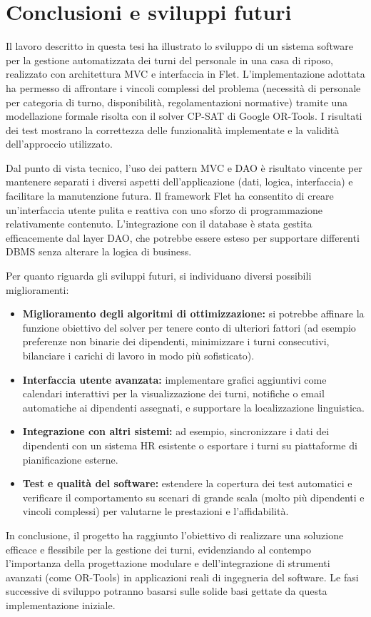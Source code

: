 \documentclass[a4paper,12pt]{report}
\begin{document}
\chapter{Conclusioni e sviluppi futuri}
\label{cap:conclusioni}
Il lavoro descritto in questa tesi ha illustrato lo sviluppo di un sistema software per la gestione automatizzata dei turni del personale in una casa di riposo, realizzato con architettura MVC e interfaccia in Flet. L'implementazione adottata ha permesso di affrontare i vincoli complessi del problema (necessit\`a di personale per categoria di turno, disponibilit\`a, regolamentazioni normative) tramite una modellazione formale risolta con il solver CP-SAT di Google OR-Tools. I risultati dei test mostrano la correttezza delle funzionalit\`a implementate e la validit\`a dell'approccio utilizzato.

Dal punto di vista tecnico, l'uso dei pattern MVC e DAO \`e risultato vincente per mantenere separati i diversi aspetti dell'applicazione (dati, logica, interfaccia) e facilitare la manutenzione futura. Il framework Flet ha consentito di creare un'interfaccia utente pulita e reattiva con uno sforzo di programmazione relativamente contenuto. L'integrazione con il database \`e stata gestita efficacemente dal layer DAO, che potrebbe essere esteso per supportare differenti DBMS senza alterare la logica di business.

Per quanto riguarda gli sviluppi futuri, si individuano diversi possibili miglioramenti:
\begin{itemize}
    \item \textbf{Miglioramento degli algoritmi di ottimizzazione:} si potrebbe affinare la funzione obiettivo del solver per tenere conto di ulteriori fattori (ad esempio preferenze non binarie dei dipendenti, minimizzare i turni consecutivi, bilanciare i carichi di lavoro in modo pi\`u sofisticato).
    \item \textbf{Interfaccia utente avanzata:} implementare grafici aggiuntivi come calendari interattivi per la visualizzazione dei turni, notifiche o email automatiche ai dipendenti assegnati, e supportare la localizzazione linguistica.
    \item \textbf{Integrazione con altri sistemi:} ad esempio, sincronizzare i dati dei dipendenti con un sistema HR esistente o esportare i turni su piattaforme di pianificazione esterne.
    \item \textbf{Test e qualit\`a del software:} estendere la copertura dei test automatici e verificare il comportamento su scenari di grande scala (molto pi\`u dipendenti e vincoli complessi) per valutarne le prestazioni e l'affidabilit\`a.
\end{itemize}

In conclusione, il progetto ha raggiunto l'obiettivo di realizzare una soluzione efficace e flessibile per la gestione dei turni, evidenziando al contempo l'importanza della progettazione modulare e dell'integrazione di strumenti avanzati (come OR-Tools) in applicazioni reali di ingegneria del software. Le fasi successive di sviluppo potranno basarsi sulle solide basi gettate da questa implementazione iniziale.
\end{document}

